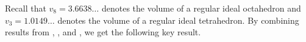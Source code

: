 \documentclass{article}
\newtheorem{definition}{Definition}[section]
\newtheorem{remark}{Remark}[section]
\begin{document}
%
%
%

Recall that $v_{8}=3.6638\ldots$ denotes the volume of a regular ideal octahedron and $v_{3}=1.0149\ldots$ denotes the volume of a regular ideal tetrahedron. By combining results from \cite{New}, \cite{Guts}, and \cite{Lackenby}, we get the following key result.
\end{document}
